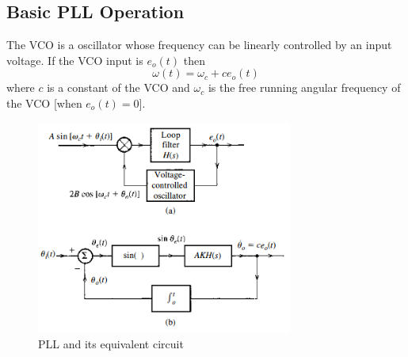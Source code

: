 \documentclass{article}
\begin{document}
    \subsection{Basic PLL Operation}
    The VCO is a oscillator whose frequency can be linearly controlled by an input voltage. If the VCO input is $e_o(t)$ then
    \begin{equation}
        \omega(t) = \omega_c + ce_o(t)
    \end{equation}
    where $c$ is a constant of the VCO and $\omega_c$ is the free running angular frequency of the VCO [when $e_o(t) = 0$].

    \begin{figure}[h]
        \centering
        \includegraphics[width=0.75\textwidth]{pll}
        \caption{PLL and its equivalent circuit}
    \end{figure}
\end{document}
